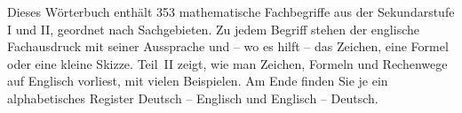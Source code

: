 \makeatletter
\newcommand\teil{\begingroup\shorthandoff{"}\teil@aux}
\newcommand\teil@aux[3]{\endgroup\part[#1 -- #2]{\raggedright #1\\[5pt]{\normalfont\Large\color{black!55}#2\hspace{0.35em}\penalty0 \ipa{#3}}}}
\newcommand\kapitel{\begingroup\shorthandoff{"}\kapitel@aux}
\newcommand\kapitel@aux[3]{\endgroup\section[#1 -- #2]{\raggedright #1\\[0pt]{\normalfont\small\color{black!55}#2\hspace{0.35em}\penalty0 \ipa{#3}}}}
\newcommand\zwischen{\begingroup\shorthandoff{"}\zwischen@aux}
\newcommand\zwischen@aux[3]{\endgroup\subsection*{\raggedright #1 {\normalfont\small\color{black!55}\,--\, #2\hspace{0.35em}\penalty0 \ipa{#3}}}}
\renewcommand\lies@aux[3]{\endgroup #1 & #2\newline{\color{black!60}#3} \\[1.5pt]}
\makeatother
\setlength{\aboverulesep}{0.15ex}\setlength{\belowrulesep}{0.3ex}\renewcommand{\arraystretch}{0.93}



\maketitle

Dieses Wörterbuch enthält 353 mathematische Fachbegriffe aus der Sekundarstufe I und II,
geordnet nach Sachgebieten. Zu jedem Begriff stehen der englische Fachausdruck mit seiner Aussprache und
-- wo es hilft -- das Zeichen, eine Formel oder eine kleine Skizze. Teil~II zeigt, wie man Zeichen,
Formeln und Rechenwege auf Englisch vorliest, mit vielen Beispielen. Am Ende finden Sie je ein
alphabetisches Register Deutsch -- Englisch und Englisch -- Deutsch.

